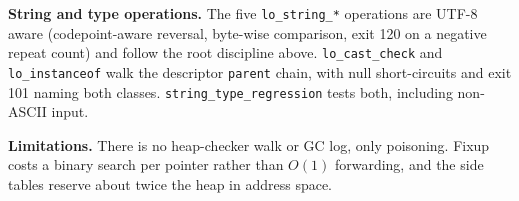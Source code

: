 \documentclass[10pt]{article}
\newcommand{\code}[1]{\texttt{\small #1}}
\begin{document}
\textbf{String and type operations.} The five \code{lo\_string\_*} operations are UTF-8 aware (codepoint-aware reversal, byte-wise comparison, exit 120 on a negative repeat count) and follow the root discipline above. \code{lo\_cast\_check} and \code{lo\_instanceof} walk the descriptor \code{parent} chain, with null short-circuits and exit 101 naming both classes. \code{string\_type\_regression} tests both, including non-ASCII input.

\textbf{Limitations.} There is no heap-checker walk or GC log, only poisoning. Fixup costs a binary search per pointer rather than $O(1)$ forwarding, and the side tables reserve about twice the heap in address space.
\end{document}

